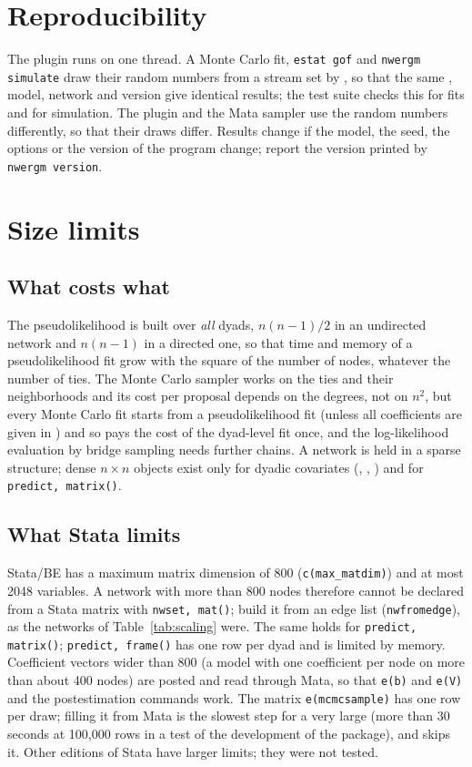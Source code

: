 \section{Reproducibility}\label{sec:repro}

The plugin runs on one thread. A Monte Carlo fit, \texttt{estat gof} and \texttt{nwergm simulate} draw their random numbers from a stream set by , so that the same , model, network and version give identical results; the test suite checks this for fits and for simulation. The plugin and the Mata sampler use the random numbers differently, so that their draws differ. Results change if the model, the seed, the options or the version of the program change; report the version printed by \texttt{nwergm version}.

\section{Size limits}\label{sec:size}

\subsection{What costs what}

The pseudolikelihood is built over \emph{all} dyads, $n(n-1)/2$ in an undirected network and $n(n-1)$ in a directed one, so that time and memory of a pseudolikelihood fit grow with the square of the number of nodes, whatever the number of ties. The Monte Carlo sampler works on the ties and their neighborhoods and its cost per proposal depends on the degrees, not on $n^2$, but every Monte Carlo fit starts from a pseudolikelihood fit (unless all coefficients are given in ) and so pays the cost of the dyad-level fit once, and the log-likelihood evaluation by bridge sampling needs further chains. A network is held in a sparse structure; dense $n\times n$ objects exist only for dyadic covariates (, , ) and for \texttt{predict, matrix()}.

\subsection{What Stata limits}

Stata/BE has a maximum matrix dimension of 800 (\texttt{c(max\_matdim)}) and at most 2048 variables. A network with more than 800 nodes therefore cannot be declared from a Stata matrix with \texttt{nwset, mat()}; build it from an edge list (\texttt{nwfromedge}), as the networks of Table~\ref{tab:scaling} were. The same holds for \texttt{predict, matrix()}; \texttt{predict, frame()} has one row per dyad and is limited by memory. Coefficient vectors wider than 800 (a model with one coefficient per node on more than about 400 nodes) are posted and read through Mata, so that \texttt{e(b)} and \texttt{e(V)} and the postestimation commands work. The matrix \texttt{e(mcmcsample)} has one row per draw; filling it from Mata is the slowest step for a very large  (more than 30 seconds at 100,000 rows in a test of the development of the package), and  skips it. Other editions of Stata have larger limits; they were not tested.

